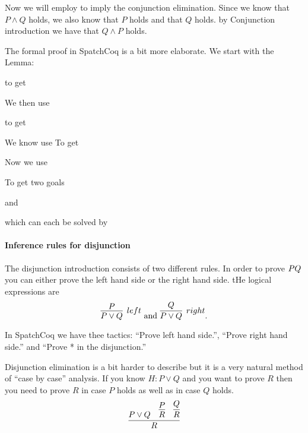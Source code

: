\begin{itemize}
Now we will employ to imply the conjunction elimination. Since we know that $P\land Q$ holds, we also know that $P$ holds and that $Q$ holds. by Conjunction introduction we have that $Q\land P$ holds.

The formal proof in SpatchCoq is a bit more elaborate. We start with the Lemma:

to get 

We then use

to get

We know use
To get

Now we use 


To get two goals

and


which can each be solved by






\paragraph{Inference rules for disjunction}

The disjunction introduction consists of two different rules. In order to prove $P\/Q$ you can either prove the left hand side or the right hand side.  tHe logical expressions are
$$\infer[left]{P\lor Q}{P} \mbox{ and } \infer[right]{P\lor Q}{Q}.$$

In SpatchCoq we have thee tactics: ``Prove left hand side.'', ``Prove right hand side.'' and 
``Prove * in the disjunction.''

Disjunction elimination is a bit harder to describe but it is a very natural method of ``case by case'' analysis. If you know $H: P\lor Q$ and you  want to prove $R$ then you need to prove $R$ in case $P$ holds as well as in case $Q$ holds.
$$\infer{R}{P\lor Q &\infer{R}{P} & \infer{R}{Q}}$$


\end{itemize}
